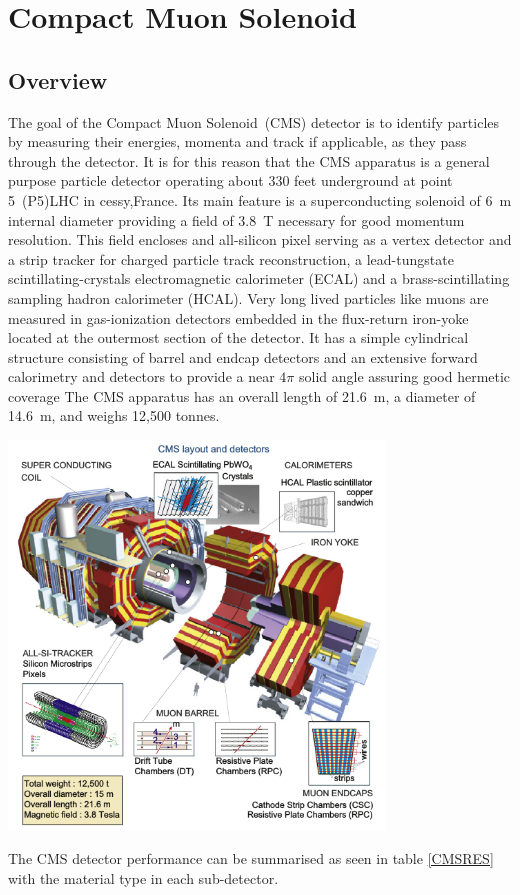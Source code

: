 \clearpage

\section{Compact Muon Solenoid}
\subsection{Overview}
The goal of the  Compact Muon Solenoid~(CMS) detector is to identify particles by measuring their energies, momenta and track if applicable, as they pass through the detector. It is for this reason that the CMS apparatus is a general purpose particle detector operating about 330 feet underground at  point 5~(P5)LHC in cessy,France. Its main feature is a superconducting solenoid of 6~m internal diameter providing a field of 3.8~T necessary for good momentum resolution. 
This field  encloses and all-silicon pixel serving as a vertex detector and a strip tracker for charged particle track reconstruction, a lead-tungstate scintillating-crystals electromagnetic calorimeter (ECAL) and a brass-scintillating sampling hadron calorimeter (HCAL). Very long lived particles like muons are measured in gas-ionization detectors embedded in the flux-return iron-yoke located at the outermost section of the detector.
It has a simple cylindrical structure consisting of barrel and endcap detectors and an extensive forward calorimetry and detectors to provide a near $4\pi$ solid angle assuring good hermetic coverage
The CMS apparatus has an overall length of 21.6~m, a diameter of 14.6~m, and weighs 12,500 tonnes. 
\begin{center}
\centering
\mbox{\includegraphics[width=10cm]{THESISPLOTS/CMS_LAYOUT_AND_DETECTORS.png}} 
\label{fig:CMS-DET}
\end{center}
The CMS detector performance can be summarised as seen in table \eqref{CMSRES} with the material type in each sub-detector.

